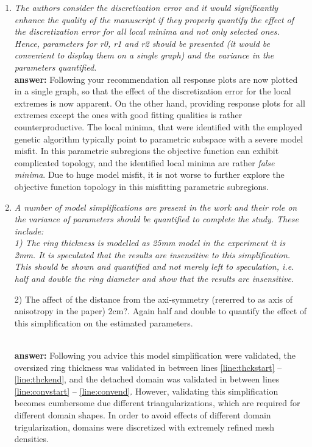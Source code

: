 \documentclass[final,3p, 11pt, a4paper]{elsarticle}
\begin{document}
\begin{enumerate}[label={\bf \Roman*}]
\item {\it  The authors consider the discretization error and it would significantly enhance the quality of the manuscript if they properly quantify the effect of the discretization error for all local minima and not only selected ones. Hence, parameters for r0, r1 and r2 should be presented (it would be convenient to display them on a single graph) and the variance in the parameters quantified.} \\ 
{\bf answer:} Following your recommendation all response plots are now plotted in a single graph, so that the effect of the discretization error for the local extremes is now apparent. On the other hand, providing response plots for all extremes except the ones with good fitting qualities is rather counterproductive. The local minima, that were identified with the employed genetic algorithm typically point to parametric subspace with a severe model misfit. In this parametric subregions the objective function can exhibit complicated topology, and the identified local minima are rather  {\it false minima}. Due to huge model misfit, it is not worse to further explore the objective function topology in this misfitting parametric subregions.

\item {\it  A number of model simplifications are present in the work and their role on the variance of parameters should be quantified to complete the study. These include: \\

 1) The ring thickness is modelled as 25mm model in the experiment it is 2mm. It is speculated that the results are insensitive to this simplification. This should be shown and quantified and not merely left to speculation, i.e. half and double the ring diameter and show that the results are insensitive.


 2) The affect of the distance from the axi-symmetry (rererred to as axis of anisotropy in the paper) 2cm?. Again half and double to quantify the effect of this simplification on the estimated parameters.} \\
 {\bf answer:} Following you advice this model simplification were validated, the oversized ring thickness was validated in between lines \ref{line:thckstart} -- \ref{line:thckend}, and the detached domain was validated in between lines \ref{line:convstart} -- \ref{line:convend}.  However, validating this simplification becomes cumbersome due different triangularizations, which are required for different domain shapes.  In order to avoid effects of different domain trigularization, domains were discretized with extremely refined mesh densities.



\end{enumerate}
\end{document}
